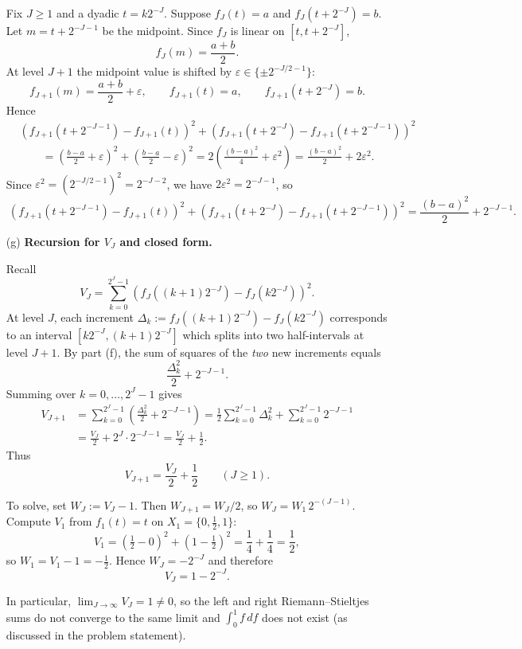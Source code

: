 \documentclass{article}
\begin{document}
\begin{enumerate}
Fix $J\ge 1$ and a dyadic $t=k2^{-J}$. Suppose $f_J(t)=a$ and $f_J(t+2^{-J})=b$.
Let $m=t+2^{-J-1}$ be the midpoint. Since $f_J$ is linear on $[t,t+2^{-J}]$,
\[
f_J(m)=\frac{a+b}{2}.
\]
At level $J+1$ the midpoint value is shifted by $\varepsilon\in\{\pm 2^{-J/2-1}\}$:
\[
f_{J+1}(m)=\frac{a+b}{2}+\varepsilon,
\qquad
f_{J+1}(t)=a,\qquad f_{J+1}(t+2^{-J})=b.
\]
Hence
\begin{align*}
&\left(f_{J+1}(t+2^{-J-1})-f_{J+1}(t)\right)^2
+
\left(f_{J+1}(t+2^{-J})-f_{J+1}(t+2^{-J-1})\right)^2 \\
&\qquad=\left(\frac{b-a}{2}+\varepsilon\right)^2+\left(\frac{b-a}{2}-\varepsilon\right)^2
=2\left(\frac{(b-a)^2}{4}+\varepsilon^2\right)
=\frac{(b-a)^2}{2}+2\varepsilon^2.
\end{align*}
Since $\varepsilon^2=(2^{-J/2-1})^2=2^{-J-2}$, we have $2\varepsilon^2=2^{-J-1}$, so
\[
\boxed{\ 
\left(f_{J+1}(t+2^{-J-1})-f_{J+1}(t)\right)^2
+
\left(f_{J+1}(t+2^{-J})-f_{J+1}(t+2^{-J-1})\right)^2
=
\frac{(b-a)^2}{2}+2^{-J-1}.
\ }
\]

\item[(g)] \textbf{Recursion for $V_J$ and closed form.}

Recall
\[
V_J=\sum_{k=0}^{2^J-1}\left(f_J((k+1)2^{-J})-f_J(k2^{-J})\right)^2.
\]
At level $J$, each increment $\Delta_k:=f_J((k+1)2^{-J})-f_J(k2^{-J})$ corresponds to an interval
$[k2^{-J},(k+1)2^{-J}]$ which splits into two half-intervals at level $J+1$.
By part (f), the sum of squares of the \emph{two} new increments equals
\[
\frac{\Delta_k^2}{2}+2^{-J-1}.
\]
Summing over $k=0,\dots,2^J-1$ gives
\begin{align*}
V_{J+1}
&=\sum_{k=0}^{2^J-1}\left(\frac{\Delta_k^2}{2}+2^{-J-1}\right)
=\frac12\sum_{k=0}^{2^J-1}\Delta_k^2+\sum_{k=0}^{2^J-1}2^{-J-1}\\
&=\frac{V_J}{2}+2^J\cdot 2^{-J-1}
=\frac{V_J}{2}+\frac12.
\end{align*}
Thus
\[
\boxed{\ V_{J+1}=\frac{V_J}{2}+\frac12\qquad(J\ge 1). \ }
\]

To solve, set $W_J:=V_J-1$. Then $W_{J+1}=W_J/2$, so $W_J=W_1\,2^{-(J-1)}$.
Compute $V_1$ from $f_1(t)=t$ on $X_1=\{0,\tfrac12,1\}$:
\[
V_1=\left(\tfrac12-0\right)^2+\left(1-\tfrac12\right)^2=\frac14+\frac14=\frac12,
\]
so $W_1=V_1-1=-\tfrac12$. Hence $W_J=-2^{-J}$ and therefore
\[
\boxed{\ V_J=1-2^{-J}. \ }
\]

In particular, $\lim_{J\to\infty}V_J=1\neq 0$, so the left and right Riemann--Stieltjes sums do not converge to
the same limit and $\int_0^1 f\,df$ does not exist (as discussed in the problem statement).
\end{enumerate}
\end{document}
